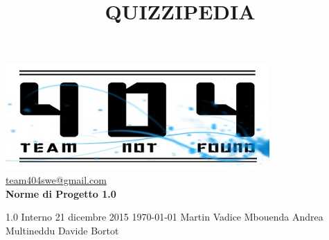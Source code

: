 \documentclass[a4paper,11pt]{article}
\title{\textbf{{\fontsize{8mm}{5mm}\selectfont QUIZZIPEDIA}}}
\date{}
\author{}
\begin{document}
	\maketitle
	\thispagestyle{empty}
	\begin{center}
	\includegraphics{../../team_not_found.jpg}\\
	\fontsize{5mm}{3mm}\url{team404swe@gmail.com}\\
	
	\vspace{50mm}
	\textbf{Norme di Progetto 1.0}	
	\end{center}
	
			{1.0} 							%
			{Interno} 						%
			{21 dicembre 2015} 				%
			{\today} 						%
			{Martin Vadice Mbouenda}		%
			{Andrea Multineddu} 			%
			{Davide Bortot} 				%
	\newpage
	\null
	\thispagestyle{empty}
	
	\newpage	
	\newpage
	\fancyfoot[R]{\thepage}
	
	\hspace{30 mm}
\end{document}
